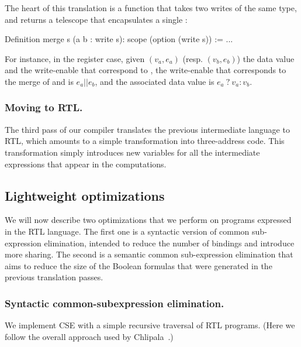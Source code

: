 \documentclass{llncs}
\begin{document}
The heart of this translation is a  function that takes
two writes of the same type, and returns a telescope that
encapsulates a single : 
\begin{mcoq}
Definition merge s (a b : write s): scope (option (write s)) := ...   
\end{mcoq}
%
For instance, in the register case, given $(v_a,e_a)$ (resp. $(v_b,
e_b)$) the data value and the write-enable that correspond to
, the write-enable that corresponds to the merge of 
and  is $e_a || e_b$, and the associated data value is
\mbox{$e_a~?~v_a : v_b$}.

\subsubsection{Moving to RTL.} The third pass of our compiler translates
the previous intermediate language to RTL, which amounts to a simple
transformation into three-address code. This transformation simply
introduces new variables for all the intermediate expressions that
appear in the computations. 

\subsection{Lightweight optimizations}
We will now describe two optimizations that we perform on programs
expressed in the RTL language. 
%
The first one is a syntactic version of common sub-expression
elimination, intended to reduce the number of bindings and introduce
more sharing. 
%
The second is a semantic common sub-expression elimination that aims
to reduce the size of the Boolean formulas that were generated in the
previous translation passes. 

\subsubsection{Syntactic common-subexpression elimination.}
We implement CSE with a simple recursive traversal of RTL
programs. (Here we follow the overall approach used by
Chlipala~\cite{DBLP:conf/popl/Chlipala10}.)
\end{document}
